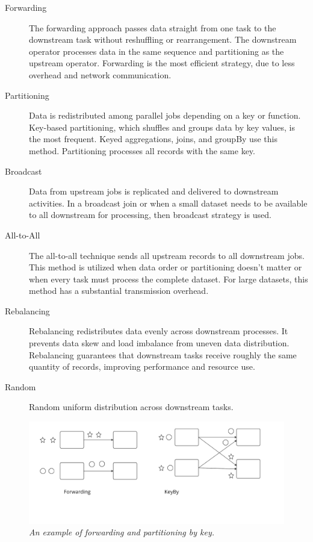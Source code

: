 \begin{description}
    \item[Forwarding] The forwarding approach passes data straight from one task
    to the downstream task without reshuffling or rearrangement.
    The downstream operator processes data in the same sequence and partitioning
    as the upstream operator.
    Forwarding is the most efficient strategy, due to less overhead and network communication.
    \item[Partitioning] Data is redistributed among parallel jobs depending on a key or function.
    Key-based partitioning, which shuffles and groups data by key values, is the most frequent.
    Keyed aggregations, joins, and groupBy use this method.
    Partitioning processes all records with the same key.
    \item[Broadcast] Data from upstream jobs is replicated and delivered to downstream activities.
    In a broadcast join or when a small dataset needs to be available to all downstream
    for processing, then broadcast strategy is used.
    \item[All-to-All] The all-to-all technique sends all upstream records to all downstream jobs.
    This method is utilized when data order or partitioning doesn't matter
    or when every task must process the complete dataset.
    For large datasets, this method has a substantial transmission overhead.
    \item[Rebalancing] Rebalancing redistributes data evenly across downstream processes.
    It prevents data skew and load imbalance from uneven data distribution.
    Rebalancing guarantees that downstream tasks receive roughly the same quantity of records,
    improving performance and resource use.
    \item[Random] Random uniform distribution across downstream tasks.
\end{description}


\begin{figure}[H]
    \centering
    \includegraphics[width=1\textwidth]{figures/forward}
    \caption{\textit{An example of forwarding and partitioning by key.}}
    \label{fig:forward}
\end{figure}

